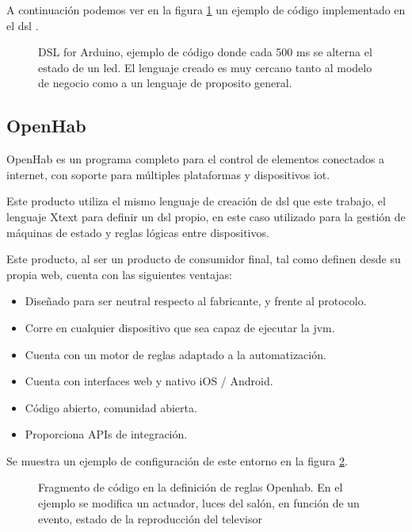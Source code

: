 A continuación podemos ver en la figura \ref{fig:dsl_for_arduino} un ejemplo de código implementado en el \gls{dsl} .

\begin{figure}
	\centering
	
	
	
    \sourcepropia{}
    \caption[DSL for Arduino ejemplo fragmento código]{DSL for Arduino, ejemplo de código donde cada 500 ms se alterna el estado de un led. El lenguaje creado es muy cercano tanto al modelo de negocio como a un lenguaje de proposito general.}
    \label{fig:dsl_for_arduino}
\end{figure}


\subsection{OpenHab}

OpenHab \cite{openhab} es un programa completo para el control de elementos conectados a internet, con soporte para múltiples plataformas y dispositivos \gls{iot}.

Este producto utiliza el mismo lenguaje de creación de \gls{dsl} que este trabajo, el lenguaje Xtext para definir un \gls{dsl} propio, en este caso utilizado para la gestión de máquinas de estado y reglas lógicas entre dispositivos.

Este producto, al ser un producto de consumidor final, tal como definen desde su propia web, cuenta con las siguientes ventajas:


\begin{itemize}
    \item Diseñado para ser neutral respecto al fabricante, y frente al protocolo.
    \item Corre en cualquier dispositivo que sea capaz de ejecutar la \gls{jvm}.
    \item Cuenta con un motor de reglas adaptado a la automatización.
    \item Cuenta con interfaces web y nativo iOS / Android.
    \item Código abierto, comunidad abierta.
    \item Proporciona APIs de integración.
\end{itemize}


Se muestra un ejemplo de configuración de este entorno en la figura \ref{fig:openhab_ejemplo}.

\begin{figure}
	\centering

    

    \caption[Openhab reglas ejemplo]{Fragmento de código en la definición de reglas Openhab. En el ejemplo se modifica un actuador, luces del salón, en función de un evento, estado de la reproducción del televisor}
    \label{fig:openhab_ejemplo}
\end{figure}
